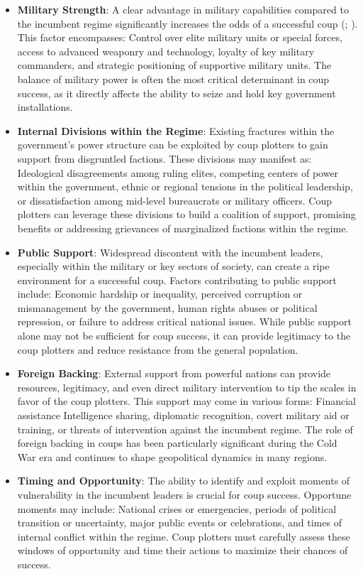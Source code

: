 \documentclass[
  12pt,
]{report}
\begin{document}
\begin{itemize}
\item
  \textbf{Military Strength}: A clear advantage in military capabilities
  compared to the incumbent regime significantly increases the odds of a
  successful coup (;
  ). This factor
  encompasses: Control over elite military units or special forces,
  access to advanced weaponry and technology, loyalty of key military
  commanders, and strategic positioning of supportive military units.
  The balance of military power is often the most critical determinant
  in coup success, as it directly affects the ability to seize and hold
  key government installations.
\item
  \textbf{Internal Divisions within the Regime}: Existing fractures
  within the government's power structure can be exploited by coup
  plotters to gain support from disgruntled factions. These divisions
  may manifest as: Ideological disagreements among ruling elites,
  competing centers of power within the government, ethnic or regional
  tensions in the political leadership, or dissatisfaction among
  mid-level bureaucrats or military officers. Coup plotters can leverage
  these divisions to build a coalition of support, promising benefits or
  addressing grievances of marginalized factions within the regime.
\item
  \textbf{Public Support}: Widespread discontent with the incumbent
  leaders, especially within the military or key sectors of society, can
  create a ripe environment for a successful coup. Factors contributing
  to public support include: Economic hardship or inequality, perceived
  corruption or mismanagement by the government, human rights abuses or
  political repression, or failure to address critical national issues.
  While public support alone may not be sufficient for coup success, it
  can provide legitimacy to the coup plotters and reduce resistance from
  the general population.
\item
  \textbf{Foreign Backing}: External support from powerful nations can
  provide resources, legitimacy, and even direct military intervention
  to tip the scales in favor of the coup plotters. This support may come
  in various forms: Financial assistance Intelligence sharing,
  diplomatic recognition, covert military aid or training, or threats of
  intervention against the incumbent regime. The role of foreign backing
  in coups has been particularly significant during the Cold War era and
  continues to shape geopolitical dynamics in many regions.
\item
  \textbf{Timing and Opportunity}: The ability to identify and exploit
  moments of vulnerability in the incumbent leaders is crucial for coup
  success. Opportune moments may include: National crises or
  emergencies, periods of political transition or uncertainty, major
  public events or celebrations, and times of internal conflict within
  the regime. Coup plotters must carefully assess these windows of
  opportunity and time their actions to maximize their chances of
  success.
\end{itemize}
\end{document}
